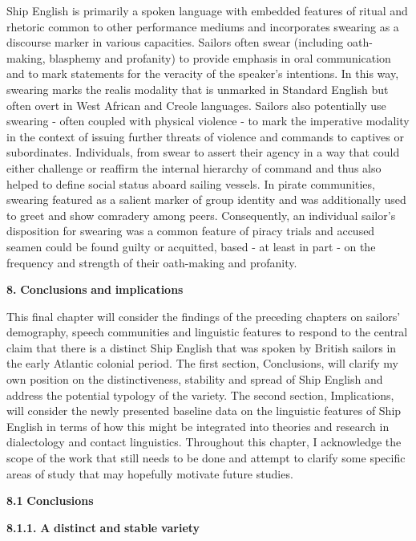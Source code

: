 Ship English is primarily a spoken language with embedded features of ritual and rhetoric common to other performance mediums and incorporates swearing as a discourse marker in various capacities. Sailors often swear (including oath-making, blasphemy and profanity) to provide emphasis in oral communication and to mark statements for the veracity of the speaker’s intentions. In this way, swearing marks the realis modality that is unmarked in Standard English but often overt in West African and Creole languages. Sailors also potentially use swearing - often coupled with physical violence - to mark the imperative modality in the context of issuing further threats of violence and commands to captives or subordinates. Individuals, from  swear to assert their agency in a way that could either challenge or reaffirm the internal hierarchy of command and thus also helped to define social status aboard sailing vessels. In pirate communities, swearing featured as a salient marker of group identity and was additionally used to greet and show comradery among peers.  Consequently, an individual sailor’s disposition for swearing was a common feature of piracy trials and accused seamen could be found guilty or acquitted, based - at least in part - on the frequency and strength of their oath-making and profanity. 

\textbf{8.} \textbf{Conclusions} \textbf{and} \textbf{implications}

This final chapter will consider the findings of the preceding chapters on sailors’ demography, speech communities and linguistic features to respond to the central claim that there is a distinct Ship English that was spoken by British sailors in the early Atlantic colonial period. The first section, Conclusions, will clarify my own position on the distinctiveness, stability and spread of Ship English and address the potential typology of the variety. The second section, Implications, will consider the newly presented baseline data on the linguistic features of Ship English in terms of how this might be integrated into theories and research in dialectology and contact linguistics. Throughout this chapter, I acknowledge the scope of the work that still needs to be done and attempt to clarify some specific areas of study that may hopefully motivate future studies.

\textbf{8.1} \textbf{Conclusions}

\textbf{8.1.1.} \textbf{A} \textbf{distinct} \textbf{and} \textbf{stable} \textbf{variety}

